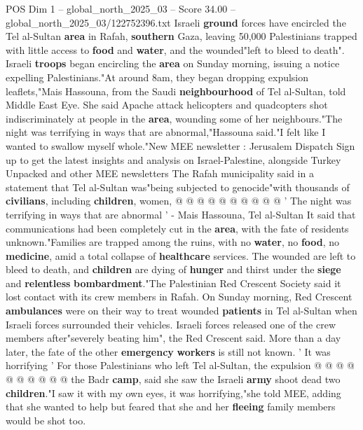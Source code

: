 \begin{textsample}{POS Dim 1 – global\_north\_2025\_03 – Score 34.00 – global\_north\_2025\_03/122752396.txt}  \label{ex:f1_pos_393}
Israeli \textbf{ground} forces have encircled the Tel al-Sultan \textbf{area} in Rafah, \textbf{southern} Gaza, leaving 50,000 Palestinians trapped with little access to \textbf{food} and \textbf{water}, and the wounded"left to bleed to death".
Israeli \textbf{troops} began encircling the \textbf{area} on Sunday morning, issuing a notice expelling Palestinians."At around 8am, they began dropping expulsion leaflets,"Mais Hassouna, from the Saudi \textbf{neighbourhood} of Tel al-Sultan, told Middle East Eye.
She said Apache attack helicopters and quadcopters shot indiscriminately at people in the \textbf{area}, wounding some of her neighbours."The night was terrifying in ways that are abnormal,"Hassouna said."I felt like I wanted to swallow myself whole."New MEE newsletter : Jerusalem Dispatch Sign up to get the latest insights and analysis on Israel-Palestine, alongside Turkey Unpacked and other MEE newsletters The Rafah municipality said in a statement that Tel al-Sultan was"being subjected to genocide"with thousands of \textbf{civilians}, including \textbf{children}, women, @ @ @ @ @ @ @ @ @ @ ' The night was terrifying in ways that are abnormal ' - Mais Hassouna, Tel al-Sultan It said that communications had been completely cut in the \textbf{area}, with the fate of residents unknown."Families are trapped among the ruins, with no \textbf{water}, no \textbf{food}, no \textbf{medicine}, amid a total collapse of \textbf{healthcare} services.
The wounded are left to bleed to death, and \textbf{children} are dying of \textbf{hunger} and thirst under the \textbf{siege} and \textbf{relentless} \textbf{bombardment}."The Palestinian Red Crescent Society said it lost contact with its crew members in Rafah.
On Sunday morning, Red Crescent \textbf{ambulances} were on their way to treat wounded \textbf{patients} in Tel al-Sultan when Israeli forces surrounded their vehicles.
Israeli forces released one of the crew members after"severely beating him", the Red Crescent said.
More than a day later, the fate of the other \textbf{emergency} \textbf{workers} is still not known. ' It was horrifying ' For those Palestinians who left Tel al-Sultan, the expulsion @ @ @ @ @ @ @ @ @ @ the Badr \textbf{camp}, said she saw the Israeli \textbf{army} shoot dead two \textbf{children}."I saw it with my own eyes, it was horrifying,"she told MEE, adding that she wanted to help but feared that she and her \textbf{fleeing} family members would be shot too.

\end{textsample}
